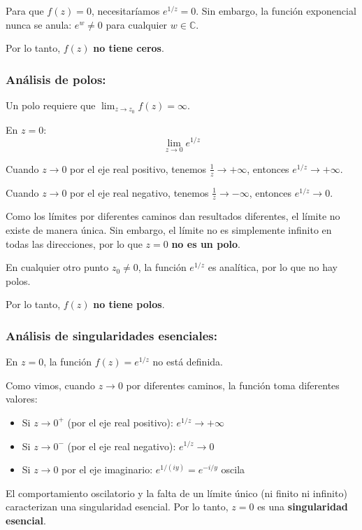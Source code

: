 \documentclass{article}
\begin{document}
Para que $f(z) = 0$, necesitaríamos $e^{1/z} = 0$. Sin embargo, la función exponencial nunca se anula: $e^w \neq 0$ para cualquier $w \in \mathbb{C}$.

Por lo tanto, $f(z)$ \textbf{no tiene ceros}.

\subsubsection*{Análisis de polos:}

Un polo requiere que $\lim_{z \to z_0} f(z) = \infty$. 

En $z = 0$:
$$\lim_{z \to 0} e^{1/z}$$

Cuando $z \to 0$ por el eje real positivo, tenemos $\frac{1}{z} \to +\infty$, entonces $e^{1/z} \to +\infty$.

Cuando $z \to 0$ por el eje real negativo, tenemos $\frac{1}{z} \to -\infty$, entonces $e^{1/z} \to 0$.

Como los límites por diferentes caminos dan resultados diferentes, el límite no existe de manera única. Sin embargo, el límite no es simplemente infinito en todas las direcciones, por lo que $z = 0$ \textbf{no es un polo}.

En cualquier otro punto $z_0 \neq 0$, la función $e^{1/z}$ es analítica, por lo que no hay polos.

Por lo tanto, $f(z)$ \textbf{no tiene polos}.

\subsubsection*{Análisis de singularidades esenciales:}

En $z = 0$, la función $f(z) = e^{1/z}$ no está definida.

Como vimos, cuando $z \to 0$ por diferentes caminos, la función toma diferentes valores:
\begin{itemize}
\item Si $z \to 0^+$ (por el eje real positivo): $e^{1/z} \to +\infty$
\item Si $z \to 0^-$ (por el eje real negativo): $e^{1/z} \to 0$
\item Si $z \to 0$ por el eje imaginario: $e^{1/(iy)} = e^{-i/y}$ oscila
\end{itemize}

El comportamiento oscilatorio y la falta de un límite único (ni finito ni infinito) caracterizan una singularidad esencial. Por lo tanto, $z = 0$ es una \textbf{singularidad esencial}.
\end{document}
